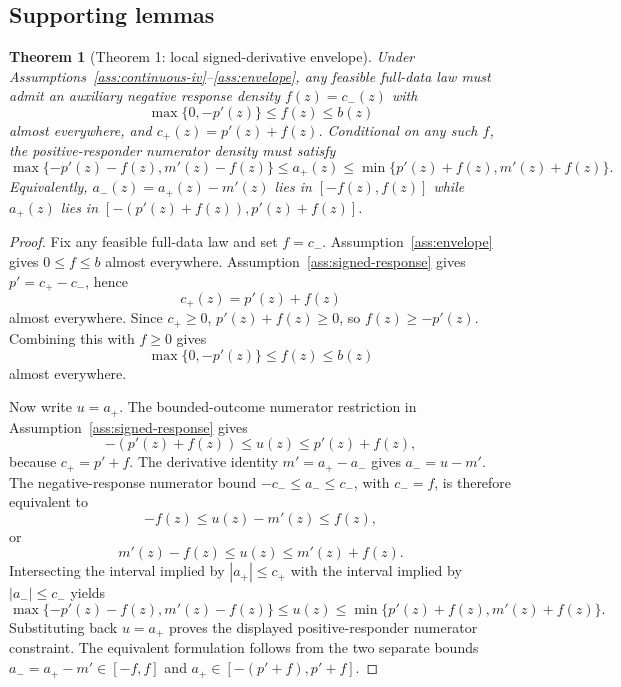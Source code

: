 \documentclass[11pt]{article}
\theoremstyle{definition}
\theoremstyle{plain}
\newtheorem{theorem}{Theorem}
\theoremstyle{remark}
\begin{document}
\subsection*{Supporting lemmas}
\begin{theorem}[Theorem 1: local signed-derivative envelope]\label{thm:local-envelope}
Under Assumptions~\ref{ass:continuous-iv}--\ref{ass:envelope}, any feasible full-data law must admit an auxiliary negative response density \(f(z)=c_-(z)\) with
\[
\max\{0,-p'(z)\}\le f(z)\le b(z)
\]
almost everywhere, and \(c_+(z)=p'(z)+f(z)\).  Conditional on any such \(f\), the positive-responder numerator density must satisfy
\[
\max\{-p'(z)-f(z),m'(z)-f(z)\}\le a_+(z)\le
\min\{p'(z)+f(z),m'(z)+f(z)\}.
\]
Equivalently, \(a_-(z)=a_+(z)-m'(z)\) lies in \([-f(z),f(z)]\) while \(a_+(z)\) lies in \([-(p'(z)+f(z)),p'(z)+f(z)]\).
\end{theorem}
\begin{proof}
Fix any feasible full-data law and set \(f=c_-\).  Assumption~\ref{ass:envelope} gives \(0\le f\le b\) almost everywhere.  Assumption~\ref{ass:signed-response} gives \(p'=c_+-c_-\), hence
\[
c_+(z)=p'(z)+f(z)
\]
almost everywhere.  Since \(c_+\ge0\), \(p'(z)+f(z)\ge0\), so \(f(z)\ge -p'(z)\).  Combining this with \(f\ge0\) gives
\[
\max\{0,-p'(z)\}\le f(z)\le b(z)
\]
almost everywhere.

Now write \(u=a_+\).  The bounded-outcome numerator restriction in Assumption~\ref{ass:signed-response} gives
\[
-(p'(z)+f(z))\le u(z)\le p'(z)+f(z),
\]
because \(c_+=p'+f\).  The derivative identity \(m'=a_+-a_-\) gives \(a_-=u-m'\).  The negative-response numerator bound \(-c_-\le a_-\le c_-\), with \(c_-=f\), is therefore equivalent to
\[
-f(z)\le u(z)-m'(z)\le f(z),
\]
or
\[
m'(z)-f(z)\le u(z)\le m'(z)+f(z).
\]
Intersecting the interval implied by \(|a_+|\le c_+\) with the interval implied by \(|a_-|\le c_-\) yields
\[
\max\{-p'(z)-f(z),m'(z)-f(z)\}\le u(z)\le
\min\{p'(z)+f(z),m'(z)+f(z)\}.
\]
Substituting back \(u=a_+\) proves the displayed positive-responder numerator constraint.  The equivalent formulation follows from the two separate bounds \(a_-=a_+-m'\in[-f,f]\) and \(a_+\in[-(p'+f),p'+f]\).
\end{proof}
\end{document}
